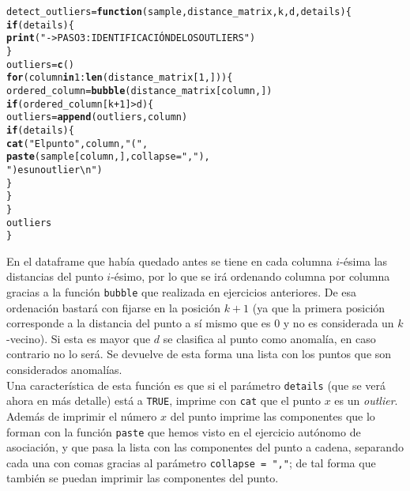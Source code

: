 \documentclass[12pt]{report}\usepackage[]{graphicx}\usepackage[dvipsnames]{xcolor}
\makeatletter
\newcommand{\hlnum}[1]{\textcolor[rgb]{0.686,0.059,0.569}{#1}}%
\newcommand{\hlstr}[1]{\textcolor[rgb]{0.192,0.494,0.8}{#1}}%
\newcommand{\hlopt}[1]{\textcolor[rgb]{0,0,0}{#1}}%
\newcommand{\hlstd}[1]{\textcolor[rgb]{0.345,0.345,0.345}{#1}}%
\newcommand{\hlkwa}[1]{\textcolor[rgb]{0.161,0.373,0.58}{\textbf{#1}}}%
\newcommand{\hlkwb}[1]{\textcolor[rgb]{0.69,0.353,0.396}{#1}}%
\newcommand{\hlkwc}[1]{\textcolor[rgb]{0.333,0.667,0.333}{#1}}%
\newcommand{\hlkwd}[1]{\textcolor[rgb]{0.737,0.353,0.396}{\textbf{#1}}}%
\newenvironment{kframe}{%
 \def\at@end@of@kframe{}%
 \ifinner\ifhmode%
  \def\at@end@of@kframe{\end{minipage}}%
  \begin{minipage}{\columnwidth}%
 \fi\fi%
 \def\FrameCommand##1{\hskip\@totalleftmargin \hskip-\fboxsep
 \colorbox{shadecolor}{##1}\hskip-\fboxsep
     \hskip-\linewidth \hskip-\@totalleftmargin \hskip\columnwidth}%
 \MakeFramed {\advance\hsize-\width
   \@totalleftmargin\z@ \linewidth\hsize
   \@setminipage}}%
 {\par\unskip\endMakeFramed%
 \at@end@of@kframe}
\newenvironment{knitrout}{}{} %
\makeatother
\begin{document}
\begin{knitrout}
\color{fgcolor}\begin{kframe}
\begin{alltt}
\hlstd{detect_outliers} \hlkwb{=} \hlkwa{function}\hlstd{(}\hlkwc{sample}\hlstd{,} \hlkwc{distance_matrix}\hlstd{,} \hlkwc{k}\hlstd{,} \hlkwc{d}\hlstd{,} \hlkwc{details}\hlstd{)\{}
        \hlkwa{if}\hlstd{(details)\{}
                \hlkwd{print}\hlstd{(}\hlstr{"->PASO 3: IDENTIFICACIÓN DE LOS OUTLIERS"}\hlstd{)}
        \hlstd{\}}
        \hlstd{outliers} \hlkwb{=} \hlkwd{c}\hlstd{()}
        \hlkwa{for} \hlstd{(column} \hlkwa{in} \hlnum{1}\hlopt{:}\hlkwd{len}\hlstd{(distance_matrix[}\hlnum{1}\hlstd{,]))\{}
                \hlstd{ordered_column} \hlkwb{=} \hlkwd{bubble}\hlstd{(distance_matrix[column,])}
                \hlkwa{if} \hlstd{(ordered_column[k}\hlopt{+}\hlnum{1}\hlstd{]} \hlopt{>} \hlstd{d)\{}
                        \hlstd{outliers} \hlkwb{=} \hlkwd{append}\hlstd{(outliers,column)}
                        \hlkwa{if}\hlstd{(details)\{}
                                \hlkwd{cat}\hlstd{(}\hlstr{"El punto"}\hlstd{, column,} \hlstr{"("}\hlstd{,}
                                \hlkwd{paste}\hlstd{(sample[column,],} \hlkwc{collapse} \hlstd{=} \hlstr{","}\hlstd{),}
                                \hlstr{") es un outlier\textbackslash{}n"}\hlstd{)}
                        \hlstd{\}}
                \hlstd{\}}
        \hlstd{\}}
        \hlstd{outliers}
\hlstd{\}}
\end{alltt}
\end{kframe}
\end{knitrout}
					
					En el dataframe que había quedado antes se tiene en cada columna $i$-ésima las distancias del punto $i$-ésimo, por lo que se irá ordenando columna por columna gracias a la función \texttt{bubble} que realizada en ejercicios anteriores. De esa ordenación bastará con fijarse en la posición $k+1$ (ya que la primera posición corresponde a la distancia del punto a sí mismo que es 0 y no es considerada un $k$-vecino). Si esta es mayor que $d$ se clasifica al punto como anomalía, en caso contrario no lo será. Se devuelve de esta forma una lista con los puntos que son considerados anomalías.\\ 
					
					Una característica de esta función es que si el parámetro \texttt{details} (que se verá ahora en más detalle) está a \texttt{TRUE}, imprime con \texttt{cat} que el punto $x$ es un \textit{outlier}. Además de imprimir el número $x$ del punto imprime las componentes que lo forman con la función \texttt{paste} que hemos visto en el ejercicio autónomo de asociación, y que pasa la lista con las componentes del punto a cadena, separando cada una con comas gracias al parámetro \texttt{collapse = ","}; de tal forma que también se puedan imprimir las componentes del punto.\\
					
\end{document}
